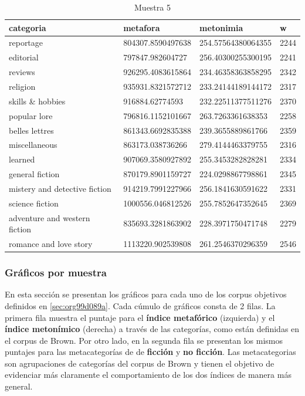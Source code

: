 \documentclass[12pt,letterpaper,twoside]{article}
\begin{document}
\begin{center}
\begin{longtable}{| p{} | p{} | p{}|p{}|}
\caption{Muestra 5}
    \hline
        categoria & metafora & metonimia & w \\ \hline
        reportage & 804307.8590497638 & 254.57564380064355 & 2244 \\ \hline
        editorial & 797847.982604727 & 256.40300255300195 & 2241 \\ \hline
        reviews & 926295.4083615864 & 234.46358363858295 & 2342 \\ \hline
        religion & 935931.8321572712 & 233.24144189144172 & 2317 \\ \hline
        skills \& hobbies & 916884.62774593 & 232.22511377511276 & 2370 \\ \hline
        popular lore & 796816.1152101667 & 263.7263361638353 & 2258 \\ \hline
        belles lettres & 861343.6692835388 & 239.3655889861766 & 2359 \\ \hline
        miscellaneous & 863173.038736266 & 279.4144463379755 & 2316 \\ \hline
        learned & 907069.3580927892 & 255.3453282828281 & 2334 \\ \hline
        general fiction & 870179.8901159727 & 224.0298867798861 & 2345 \\ \hline
        mistery and detective fiction & 914219.7991227966 & 256.1841630591622 & 2331 \\ \hline
        science fiction & 1000556.046812526 & 255.7852647352645 & 2369 \\ \hline
        adventure and western fiction & 835693.3281863902 & 228.3971750471748 & 2279 \\ \hline
        romance and love story & 1113220.902539808 & 261.2546370296359 & 2546 \\ \hline
\end{longtable}
    \label{muestra5}
\end{center}
\subsubsection{Gráficos por muestra}
\label{sec:org6dd940b}
En esta sección se presentan los gráficos para cada uno de los corpus objetivos
definidos en \ref{sec:org99d089a}. Cada cúmulo de gráficos consta de 2 filas.
La primera fila muestra el puntaje para el \textbf{índice metafórico} (izquierda) y
el \textbf{índice metonímico} (derecha) a través de las categorías, como están
definidas en el corpus de Brown. Por otro lado, en la segunda fila
se presentan los mismos puntajes para las metacategorías de de \textbf{ficción}
y \textbf{no ficción}. Las metacategorias son agrupaciones de categorías del corpus
de Brown y tienen el objetivo de evidenciar más claramente el comportamiento
de los dos índices de manera más general.
\end{document}
